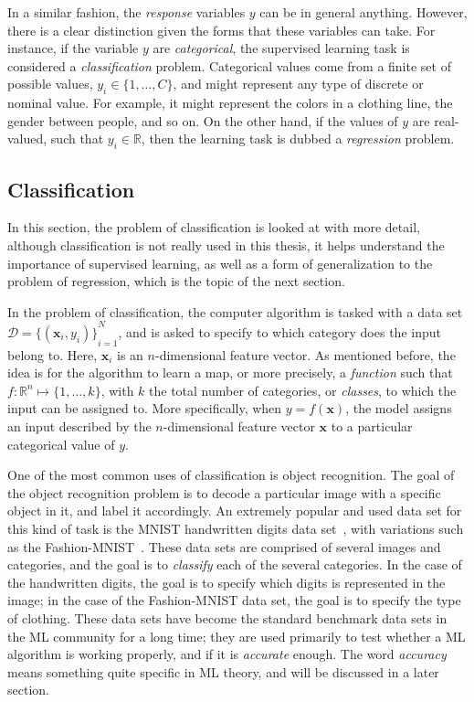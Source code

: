 In a similar fashion, the \emph{response} variables $y$ can be in general anything. However,
there is a clear distinction given the forms that these variables can take. For instance,
if the variable $y$ are \emph{categorical}, the supervised learning task is considered
a \emph{classification} problem. Categorical values come from a finite set of possible 
values, $y_{i} \in \{1, \dots, C\}$, and might represent any type of discrete or nominal
value. For example, it might represent the colors in a clothing line, the gender between
people, and so on. On the other hand, if the values of $y$ are real-valued, such that 
$y_{i} \in \mathbb{R}$, then the learning task is dubbed a \emph{regression} problem.

\subsection{Classification}
In this section, the problem of classification is looked at with more detail, although 
classification is not really used in this thesis, it helps understand the importance of 
supervised learning, as well as a form of generalization to the problem of regression, 
which is the topic of the next section.

In the problem of classification, the computer algorithm is tasked with a data set $\mathcal
{D}={ \{(\mathbf{x}_{i}, y_i)\} }_{i=1}^{N}$, and is asked to specify to which category 
does the input belong to. Here, $\mathbf{x}_i$ is an $n$-dimensional feature vector. As 
mentioned before, the idea is for the algorithm to learn a map, or more precisely, a \emph
{function} such that $f \colon \mathbb{R}^n \mapsto \{1, \dots, k\}$, with $k$ the total 
number of categories, or \emph{classes}, to which the input can be assigned to. More 
specifically, when $y=f(\mathbf{x})$, the model assigns an input described by the 
$n$-dimensional feature vector $\mathbf{x}$ to a particular categorical value of $y$.

One of the most common uses of classification is object recognition. The goal of the object 
recognition problem is to decode a particular image with a specific object in it, and label 
it accordingly. An extremely popular and used data set for this kind of task is the MNIST 
handwritten digits data set~\cite{lecunGradientbasedLearningApplied1998a}, with variations 
such as the Fashion-MNIST~\cite{xiaoFashionMNISTNovelImage2017a}. These data sets are 
comprised of several images and categories, and the goal is to \emph{classify} each of the 
several categories. In the case of the handwritten digits, the goal is to specify which 
digits is represented in the image; in the case of the Fashion-MNIST data set, the goal is 
to specify the type of clothing. These data sets have become the standard benchmark data 
sets in the ML community for a long time; they are used primarily to test whether a ML 
algorithm is working properly, and if it is \emph{accurate} enough. The word 
\emph{accuracy} means something quite specific in ML theory, and will be discussed in a 
later section.

